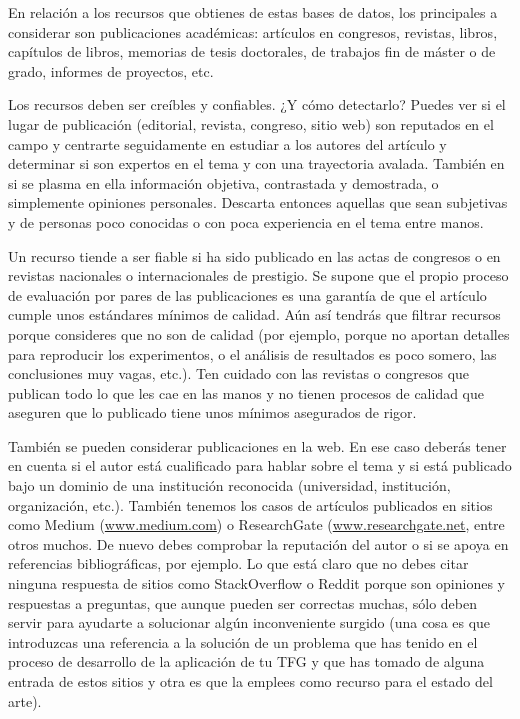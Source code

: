 En relación a los recursos que obtienes de estas bases de datos, los principales a considerar son publicaciones académicas: artículos en congresos, revistas, libros, capítulos de libros, memorias de tesis doctorales, de trabajos fin de máster o de grado, informes de proyectos, etc. 

Los recursos deben ser creíbles y confiables. ¿Y cómo detectarlo? Puedes ver si el lugar de publicación (editorial, revista, congreso, sitio web) son reputados en el campo y centrarte seguidamente en estudiar a los autores del artículo y determinar si son expertos en el tema y con una trayectoria avalada. También en si se plasma en ella información objetiva, contrastada y demostrada, o simplemente opiniones personales. Descarta entonces aquellas que sean subjetivas y de personas poco conocidas o con poca experiencia en el tema entre manos. 

Un recurso tiende a ser fiable si ha sido publicado en las actas de congresos o en revistas nacionales o internacionales de prestigio. Se supone que el propio proceso de evaluación por pares de las publicaciones es una garantía de que el artículo cumple unos estándares mínimos de calidad. Aún así tendrás que filtrar recursos porque consideres que no son de calidad (por ejemplo, porque no aportan detalles para reproducir los experimentos, o el análisis de resultados es poco somero, las conclusiones muy vagas, etc.). Ten cuidado con las revistas o congresos que publican todo lo que les cae en las manos y no tienen procesos de calidad que aseguren que lo publicado tiene unos mínimos asegurados de rigor.

También se pueden considerar publicaciones en la web. En ese caso deberás tener en cuenta si el autor está cualificado para hablar sobre el tema y si está publicado bajo un dominio de una institución reconocida (universidad, institución, organización, etc.). También tenemos los casos de artículos publicados en sitios como Medium (\url{www.medium.com}) o ResearchGate (\url{www.researchgate.net}, entre otros muchos. De nuevo debes comprobar la reputación del autor o si se apoya en referencias bibliográficas, por ejemplo. Lo que está claro que no debes citar ninguna respuesta de sitios como StackOverflow o Reddit porque son opiniones y respuestas a preguntas, que aunque pueden ser correctas muchas, sólo deben servir para ayudarte a solucionar algún inconveniente surgido (una cosa es que introduzcas una referencia a la solución de un problema que has tenido en el proceso de desarrollo de la aplicación de tu TFG y que has tomado de alguna entrada de estos sitios y otra es que la emplees como recurso para el estado del arte).

